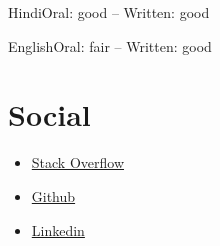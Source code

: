 \documentclass{tccv}
\begin{document}
\begin{factlist}
\item{Hindi}{Oral: good -- Written: good}
\item{English}{Oral: fair -- Written: good}
\end{factlist}

\section{Social}
\begin{itemize}
\item \href{https://stackoverflow.com/users/4373992/jha-g}{Stack Overflow}
\item \href{https://github.com/jha-g}{Github}
\item \href{https://www.linkedin.com/in/gautam0217}{Linkedin}
\end{itemize}
\end{document}
